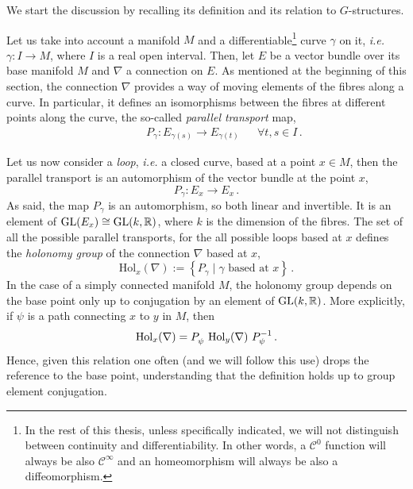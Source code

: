 \documentclass[debug]{phd}
\begin{document}
					We start the discussion by recalling its definition and its relation to $G$-structures.
					
					Let us take into account a manifold $M$ and a differentiable\footnote{%
						In the rest of this thesis, unless specifically indicated, we will not distinguish between continuity and differentiability. In other words, a $\mathcal{C}^0$ function will always be also $\mathcal{C}^\infty$ and an homeomorphism will always be also a diffeomorphism.%
						}
					curve $\gamma$ on it, \emph{i.e.} $\gamma : I \rightarrow M$, where $I$ is a real open interval.
					Then, let $E$ be a vector bundle over its base manifold $M$ and $\nabla$ a connection on $E$. 
					As mentioned at the beginning of this section, the connection $\nabla$ provides a way of moving elements of the fibres along a curve. 
					In particular, it defines an isomorphisms between the fibres at different points along the curve, the so-called \emph{parallel transport} map,
							\begin{align}
								& & & & P_\gamma : E_{\gamma(s)} \rightarrow E_{\gamma(t)} & & \forall t,s \in I\, .
							\end{align}
					
					Let us now consider a \emph{loop}, \emph{i.e.} a closed curve, based at a point $x \in M$, then the parallel transport is an automorphism of the vector bundle at the point $x$,
							\begin{equation}
								P_\gamma : E_{x} \rightarrow E_{x}\, .
							\end{equation}
					As said, the map $P_\gamma$ is an automorphism, so both linear and invertible.
					It is an element of $\mathrm{GL}(E_x) \cong \mathrm{GL}(k, \mathbb{R})$, where $k$ is the dimension of the fibres.
					The set of all the possible parallel transports, for the all possible loops based at $x$ defines the \emph{holonomy group} of the connection $\nabla$ based at $x$,
							\begin{equation*}
								\mathrm{Hol}_x (\nabla) := \left\{ P_\gamma \mid \gamma \text{ based at } x \right\}\, .
							\end{equation*}
					In the case of a simply connected manifold $M$, the holonomy group depends on the base point only up to conjugation by an element of $\mathrm{GL}(k,\mathbb{R})$.
					More explicitly, if $\psi$ is a path connecting $x$ to $y$ in $M$, then
							\begin{equation*}
								\mathrm{Hol}_x (\nabla) =  P_\psi^{\vphantom{-1}}\ \mathrm{Hol}_y (\nabla)\ P_\psi^{-1}\, .
							\end{equation*}
					Hence, given this relation one often (and we will follow this use) drops the reference to the base point, understanding that the definition holds up to group element conjugation.
					
\end{document}
